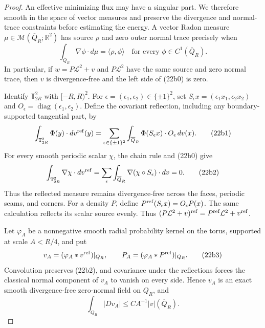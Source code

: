 \documentclass{smfart}
\theoremstyle{definition}
\newcommand{\1}{\mathbf 1}
\begin{document}
\begin{proof}
An effective minimizing flux may have a singular part.  We therefore
smooth in the space of vector measures and preserve the divergence and
normal-trace constraints before estimating the energy.  A vector
Radon measure $\mu\in\mathcal M(\overline Q_ R;\mathbb R^2)$ has
source $\rho$ and zero outer normal trace precisely when
\begin{equation}
\int_ {\overline Q_ R}\nabla\phi\cdot d\mu
=\langle\rho,\phi\rangle
\quad\text{for every }\phi\in C^1(\overline Q_ R).
\tag{22b0}
\end{equation}
In particular, if $w=P\mathcal L^2+v$ and $P\mathcal L^2$ have
the same source and zero normal trace, then $v$ is divergence-free
and the left side of (22b0) is zero.

Identify $\mathbb T_ {2R}^2$ with $[-R,R)^2$.  For
$\epsilon=(\epsilon_ 1,\epsilon_ 2)\in\{\pm1\}^2$, set
$S_ \epsilon x=(\epsilon_ 1x_ 1,\epsilon_ 2x_ 2)$ and
$O_ \epsilon=\operatorname {diag}(\epsilon_ 1,\epsilon_ 2)$.  Define
the covariant reflection, including any boundary-supported tangential
part, by
\begin{equation}
\int_ {\mathbb T_ {2R}^2}\Phi(y)\cdot dv^{\rm ref}(y)
=\sum_ {\epsilon\in\{\pm1\}^2}\int_ {\overline Q_ R}
\Phi(S_ \epsilon x)\cdot O_ \epsilon\,dv(x).
\tag{22b1}
\end{equation}
For every smooth periodic scalar $\chi$, the chain rule and (22b0)
give
\begin{equation}
\int_ {\mathbb T_ {2R}^2}\nabla\chi\cdot dv^{\rm ref}
=\sum_ \epsilon\int_ {\overline Q_ R}
\nabla(\chi\circ S_ \epsilon)\cdot dv=0.
\tag{22b2}
\end{equation}
Thus the reflected measure remains divergence-free across the faces,
periodic seams, and corners.  For a density $P$, define
$P^{\rm ref}(S_ \epsilon x)=O_ \epsilon P(x)$.  The same calculation
reflects its scalar source evenly.  Thus
$(P\mathcal L^2+v)^{\rm ref}=P^{\rm ref}\mathcal L^2+v^{\rm ref}$.

Let $\varphi_ A$ be a nonnegative smooth radial probability kernel on
the torus, supported at scale $A<R/4$, and put
\begin{equation}
v_ A=(\varphi_ A*v^{\rm ref})|_ {Q_ R},\qquad
P_ A=(\varphi_ A*P^{\rm ref})|_ {Q_ R}.
\tag{22b3}
\end{equation}
Convolution preserves (22b2), and covariance under the reflections
forces the classical normal component of $v_ A$ to vanish on every
side.  Hence $v_ A$ is an exact smooth divergence-free zero-normal
field on $Q_ R$, and
\begin{equation}
\int_ {Q_ R}|Dv_ A|\leq CA^{-1}|v|(\overline Q_ R).
\tag{22b4}
\end{equation}


\end{proof}
\end{document}
